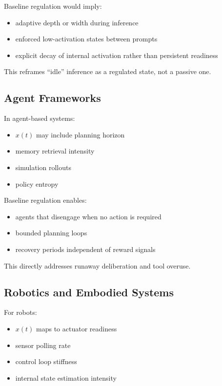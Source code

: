 \documentclass[11pt]{article}
\begin{document}
Baseline regulation would imply:

\begin{itemize}
\item adaptive depth or width during inference
\item enforced low-activation states between prompts
\item explicit decay of internal activation rather than persistent readiness
\end{itemize}

This reframes “idle” inference as a regulated state, not a passive one.

\subsection{Agent Frameworks}
In agent-based systems:

\begin{itemize}
\item \(x(t)\) may include planning horizon
\item memory retrieval intensity
\item simulation rollouts
\item policy entropy
\end{itemize}

Baseline regulation enables:

\begin{itemize}
\item agents that disengage when no action is required
\item bounded planning loops
\item recovery periods independent of reward signals
\end{itemize}

This directly addresses runaway deliberation and tool overuse.

\subsection{Robotics and Embodied Systems}
For robots:

\begin{itemize}
\item \(x(t)\) maps to actuator readiness
\item sensor polling rate
\item control loop stiffness
\item internal state estimation intensity
\end{itemize}
\end{document}
